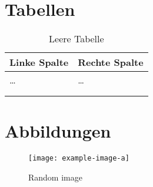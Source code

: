 \documentclass[
    load-dhbw-templates,                      %
    add-tocs-to-toc,                          %
    add-bibliography,                         %
    bib-file         = biblatex-examples.bib, %
    auto-intro-pages = all,                   %
    language         = english,               %
    language         = ngerman,               %
    debug                                     %
]{iodhbwm}
\begin{document}
    \Blinddocument

    \chapter{Tabellen}
        \blindtext

        \begin{table}[htb]
            \centering
            \begin{tabular}{@{}ll@{}}
                \toprule
                Linke Spalte & Rechte Spalte\\\midrule
                \dots & \dots\\
                &\\
                &\\\bottomrule
            \end{tabular}
            \caption{Leere Tabelle}
        \end{table}

        \blindtext

    \chapter{Abbildungen}
        \blindtext

        \begin{figure}[htb]
            \centering
            \texttt{[image: example-image-a]}
            \caption{Random image}
        \end{figure}

        \blindtext

    \nocite{*}
\end{document}
